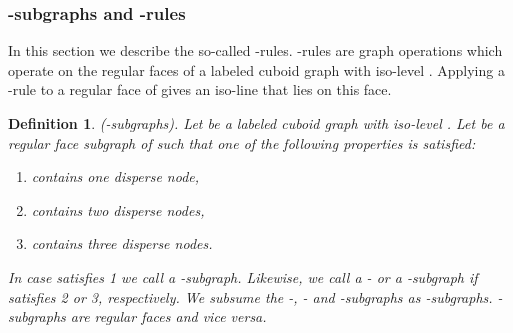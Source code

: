 \documentclass[a4paper,11pt]{article}
\newtheorem{definition}[theorem]{Definition}
\begin{document}
\subsubsection{-subgraphs and -rules}
In this section we describe the so-called -rules. -rules are graph operations which operate
on the regular faces of a labeled cuboid graph  with iso-level .
Applying a -rule to a regular face of  gives an iso-line that lies on this face.

\begin{definition}(-subgraphs). Let  be a labeled cuboid graph with
iso-level . Let  be a regular face subgraph of  such that
one of the following properties is satisfied:
\begin{enumerate}
\item  contains one disperse node,
\item  contains two disperse nodes,
\item  contains three disperse nodes.
\end{enumerate}
In case  satisfies 1 we call  a -subgraph. Likewise, we call  a - or a -subgraph
if  satisfies 2 or 3, respectively. We subsume the -, - and -subgraphs as -subgraphs.
-subgraphs are regular faces and vice versa.
\label{def:iso-path-22}
\end{definition}
\end{document}
